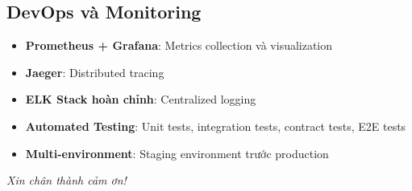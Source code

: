 \documentclass[12pt]{extreport}
\begin{document}
\subsection{DevOps và Monitoring}

\begin{itemize}
    \item \textbf{Prometheus + Grafana}: Metrics collection và visualization
    \item \textbf{Jaeger}: Distributed tracing
    \item \textbf{ELK Stack hoàn chỉnh}: Centralized logging
    \item \textbf{Automated Testing}: Unit tests, integration tests, contract tests, E2E tests
    \item \textbf{Multi-environment}: Staging environment trước production
\end{itemize}

\vspace{1cm}
\begin{flushright}
    \textit{Xin chân thành cảm ơn!}
\end{flushright}
\end{document}
